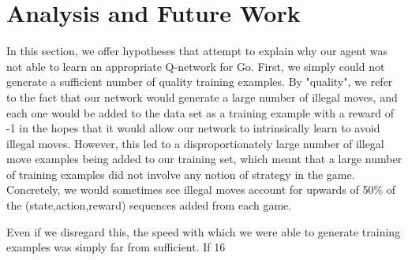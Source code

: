 \section{Analysis and Future Work}
In this section, we offer hypotheses that attempt to explain why our agent was not able to learn an appropriate Q-network for Go. First, we simply could not generate a sufficient number of quality training examples. By "quality", we refer to the fact that our network would generate a large number of illegal moves, and each one would be added to the data set as a training example with a reward of -1 in the hopes that it would allow our network to intrinsically learn to avoid illegal moves. However, this led to a disproportionately large number of illegal move examples being added to our training set, which meant that a large number of training examples did not involve any notion of strategy in the game. Concretely, we would sometimes see illegal moves account for upwards of 50\% of the (state,action,reward) sequences added from each game.

Even if we disregard this, the speed with which we were able to generate training examples was simply far from sufficient. If 16 